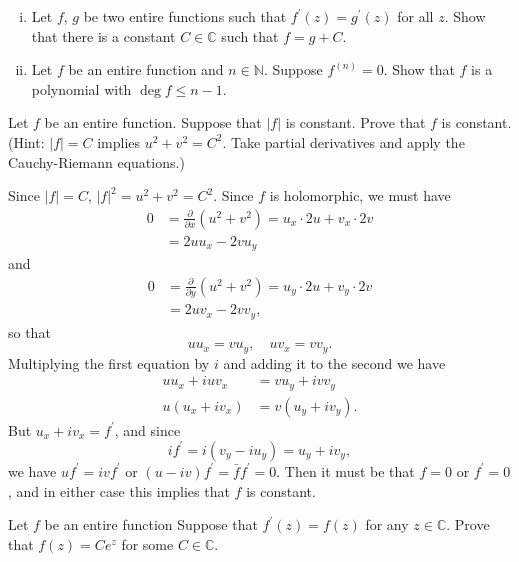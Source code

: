\documentclass{article}
\newcounter{Problem}
\newenvironment{Problem}{\begin{Exercise}[name={Problem},
                                          counter={Problem}]}
                        {\end{Exercise}}
\begin{document}
\begin{Problem}
  \begin{enumerate}[(i)]
    \item{
      Let $f$, $g$ be two entire functions such that
      $f^\prime(z) = g^\prime(z)$ for all $z$. Show that there is a
      constant $C \in \mathbb{C}$ such that $f = g + C$.
    }
    \item{
      Let $f$ be an entire function and $n \in \mathbb{N}$.
      Suppose $f^{(n)} = 0$. Show that $f$ is a polynomial
      with $\deg f \leq n - 1$.
    }
  \end{enumerate}
\end{Problem}

\begin{Problem}
  Let $f$ be an entire function. Suppose that $|f|$ is constant. Prove
  that $f$ is constant.
  (Hint: $|f| = C$ implies $u^2 + v^2 = C^2$. Take partial derivatives
  and apply the Cauchy-Riemann equations.)
\end{Problem}

\begin{Answer}
  Since $|f| = C$, $|f|^2 = u^2 + v^2 = C^2$. Since $f$ is
  holomorphic, we must have
  \begin{align*}
    0 &= \frac{\partial}{\partial x} (u^2 + v^2)
       = u_x \cdot 2 u + v_x \cdot 2 v \\
      &= 2 u u_x - 2 v u_y
  \end{align*}
  and
  \begin{align*}
    0 &= \frac{\partial}{\partial y} (u^2 + v^2)
       = u_y \cdot 2 u + v_y \cdot 2 v \\
      &= 2 u v_x - 2 v v_y,
  \end{align*}
  so that
  $$
  u u_x = v u_y, \quad
  u v_x = v v_y.
  $$
  Multiplying the first equation by $i$ and adding it to the second we
  have
  \begin{align*}
  u u_x + i u v_x &= v u_y + i v v_y \\
  u (u_x + i v_x) &= v (u_y + i v_y).
  \end{align*}
  But $u_x + i v_x = f^\prime$, and since
  $$
  i f^\prime = i(v_y - i u_y) = u_y + i v_y,
  $$
  we have $u f^\prime = i v f^\prime$ or
  $(u - iv)f^\prime = \bar{f} f^\prime = 0$. Then it must be that
  $f = 0$ or $f^\prime = 0$, and in either case this implies that $f$
  is constant.
\end{Answer}

\begin{Problem}
  Let $f$ be an entire function Suppose that $f^\prime(z) = f(z)$ for
  any $z \in \mathbb{C}$. Prove that $f(z) = C e^z$ for some
  $C \in \mathbb{C}$.
\end{Problem}
\end{document}

